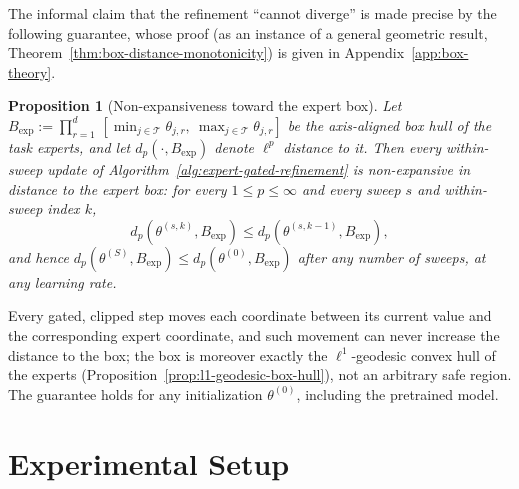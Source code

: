 \documentclass{article} %
\newcommand{\tasks}{\mathcal{T}}
\newtheorem{proposition}{Proposition}
\begin{document}
The informal claim that the refinement ``cannot diverge'' is made precise by the following guarantee, whose proof (as an instance of a general geometric result, Theorem~\ref{thm:box-distance-monotonicity}) is given in Appendix~\ref{app:box-theory}.

\begin{proposition}[Non-expansiveness toward the expert box]
\label{prop:box-nonexpansive}
Let
$B_{\mathrm{exp}}:=\prod_{r=1}^{d}\,[\min_{j\in\tasks}\theta_{j,r},\ \max_{j\in\tasks}\theta_{j,r}]$
be the axis-aligned box hull of the task experts, and let $d_p(\cdot,B_{\mathrm{exp}})$ denote $\ell^p$ distance to it. Then every within-sweep update of Algorithm~\ref{alg:expert-gated-refinement} is non-expansive in distance to the expert box: for every $1\le p\le\infty$ and every sweep $s$ and within-sweep index $k$,
\[
    d_p\!\left(\theta^{(s,k)},B_{\mathrm{exp}}\right)
    \le
    d_p\!\left(\theta^{(s,k-1)},B_{\mathrm{exp}}\right),
\]
and hence $d_p(\theta^{(S)},B_{\mathrm{exp}})\le d_p(\theta^{(0)},B_{\mathrm{exp}})$ after any number of sweeps, at any learning rate.
\end{proposition}

Every gated, clipped step moves each coordinate between its current value and the corresponding expert coordinate, and such movement can never increase the distance to the box; the box is moreover exactly the $\ell^1$-geodesic convex hull of the experts (Proposition~\ref{prop:l1-geodesic-box-hull}), not an arbitrary safe region. The guarantee holds for any initialization $\theta^{(0)}$, including the pretrained model.

\section{Experimental Setup}
\label{sec:protocol}

\end{document}
